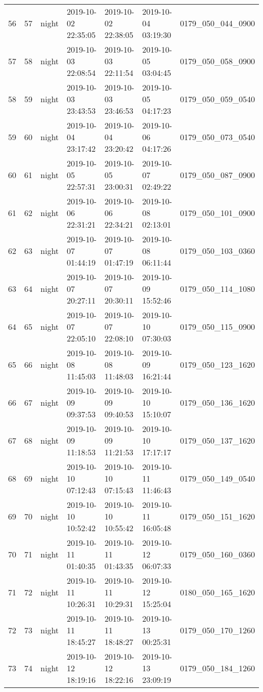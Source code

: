 \begin{longtable}{lrlllll}
56 & 57 & night & 2019-10-02 22:35:05 & 2019-10-02 22:38:05 & 2019-10-04 03:19:30 & 0179_050_044_0900 \\
57 & 58 & night & 2019-10-03 22:08:54 & 2019-10-03 22:11:54 & 2019-10-05 03:04:45 & 0179_050_058_0900 \\
58 & 59 & night & 2019-10-03 23:43:53 & 2019-10-03 23:46:53 & 2019-10-05 04:17:23 & 0179_050_059_0540 \\
59 & 60 & night & 2019-10-04 23:17:42 & 2019-10-04 23:20:42 & 2019-10-06 04:17:26 & 0179_050_073_0540 \\
60 & 61 & night & 2019-10-05 22:57:31 & 2019-10-05 23:00:31 & 2019-10-07 02:49:22 & 0179_050_087_0900 \\
61 & 62 & night & 2019-10-06 22:31:21 & 2019-10-06 22:34:21 & 2019-10-08 02:13:01 & 0179_050_101_0900 \\
62 & 63 & night & 2019-10-07 01:44:19 & 2019-10-07 01:47:19 & 2019-10-08 06:11:44 & 0179_050_103_0360 \\
63 & 64 & night & 2019-10-07 20:27:11 & 2019-10-07 20:30:11 & 2019-10-09 15:52:46 & 0179_050_114_1080 \\
64 & 65 & night & 2019-10-07 22:05:10 & 2019-10-07 22:08:10 & 2019-10-10 07:30:03 & 0179_050_115_0900 \\
65 & 66 & night & 2019-10-08 11:45:03 & 2019-10-08 11:48:03 & 2019-10-09 16:21:44 & 0179_050_123_1620 \\
66 & 67 & night & 2019-10-09 09:37:53 & 2019-10-09 09:40:53 & 2019-10-10 15:10:07 & 0179_050_136_1620 \\
67 & 68 & night & 2019-10-09 11:18:53 & 2019-10-09 11:21:53 & 2019-10-10 17:17:17 & 0179_050_137_1620 \\
68 & 69 & night & 2019-10-10 07:12:43 & 2019-10-10 07:15:43 & 2019-10-11 11:46:43 & 0179_050_149_0540 \\
69 & 70 & night & 2019-10-10 10:52:42 & 2019-10-10 10:55:42 & 2019-10-11 16:05:48 & 0179_050_151_1620 \\
70 & 71 & night & 2019-10-11 01:40:35 & 2019-10-11 01:43:35 & 2019-10-12 06:07:33 & 0179_050_160_0360 \\
71 & 72 & night & 2019-10-11 10:26:31 & 2019-10-11 10:29:31 & 2019-10-12 15:25:04 & 0180_050_165_1620 \\
72 & 73 & night & 2019-10-11 18:45:27 & 2019-10-11 18:48:27 & 2019-10-13 00:25:31 & 0179_050_170_1260 \\
73 & 74 & night & 2019-10-12 18:19:16 & 2019-10-12 18:22:16 & 2019-10-13 23:09:19 & 0179_050_184_1260 \\

\end{longtable}
